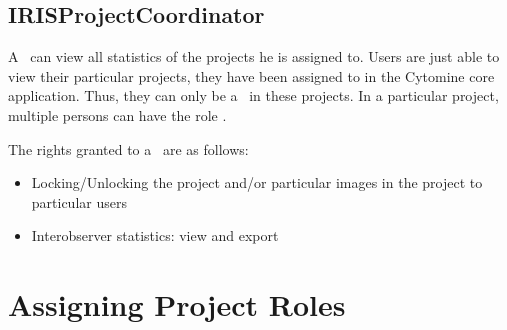 \subsection{IRISProjectCoordinator}
A \pjcoord\ can view all statistics of the projects he is assigned to. 
Users are just able to view their particular projects, they have been assigned to in the Cytomine core application.
Thus, they can only be a \pjcoord\ in these projects. 
In a particular project, multiple persons can have the role \pjcoord . 

The rights granted to a \pjcoord\ are as follows:
\begin{itemize}
\item Locking/Unlocking the project and/or particular images in the project to particular users
\item Interobserver statistics: view and export
\end{itemize}



\section{Assigning Project Roles}





%







